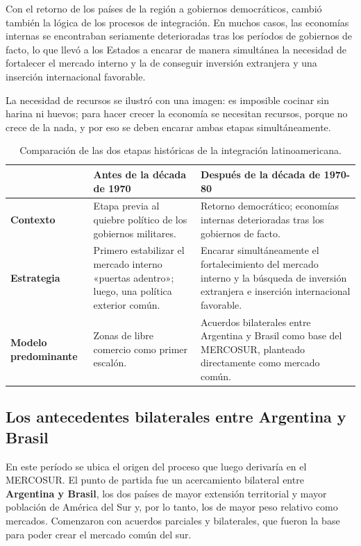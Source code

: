 \documentclass[12pt,oneside]{book}
\begin{document}
Con el retorno de los países de la región a gobiernos democráticos, cambió también la lógica de los procesos de integración. En muchos casos, las economías internas se encontraban seriamente deterioradas tras los períodos de gobiernos de facto, lo que llevó a los Estados a encarar de manera simultánea la necesidad de fortalecer el mercado interno y la de conseguir inversión extranjera y una inserción internacional favorable.

La necesidad de recursos se ilustró con una imagen: es imposible cocinar sin harina ni huevos; para hacer crecer la economía se necesitan recursos, porque no crece de la nada, y por eso se deben encarar ambas etapas simultáneamente.

\begin{table}[H]
\centering
\renewcommand{\arraystretch}{1.3}
\begin{tabularx}{\textwidth}{
    >{\raggedright\arraybackslash}p{}
    >{\raggedright\arraybackslash}X
    >{\raggedright\arraybackslash}X
}
\toprule
 & \textbf{Antes de la década de 1970} & \textbf{Después de la década de 1970-80} \\
\midrule
\textbf{Contexto} & Etapa previa al quiebre político de los gobiernos militares. & Retorno democrático; economías internas deterioradas tras los gobiernos de facto. \\
\textbf{Estrategia} & Primero estabilizar el mercado interno «puertas adentro»; luego, una política exterior común. & Encarar simultáneamente el fortalecimiento del mercado interno y la búsqueda de inversión extranjera e inserción internacional favorable. \\
\textbf{Modelo predominante} & Zonas de libre comercio como primer escalón. & Acuerdos bilaterales entre Argentina y Brasil como base del MERCOSUR, planteado directamente como mercado común. \\
\bottomrule
\end{tabularx}
\caption*{Comparación de las dos etapas históricas de la integración latinoamericana.}
\end{table}

\subsection{Los antecedentes bilaterales entre Argentina y Brasil}

En este período se ubica el origen del proceso que luego derivaría en el MERCOSUR. El punto de partida fue un acercamiento bilateral entre \textbf{Argentina y Brasil}, los dos países de mayor extensión territorial y mayor población de América del Sur y, por lo tanto, los de mayor peso relativo como mercados. Comenzaron con acuerdos parciales y bilaterales, que fueron la base para poder crear el mercado común del sur.
\end{document}
